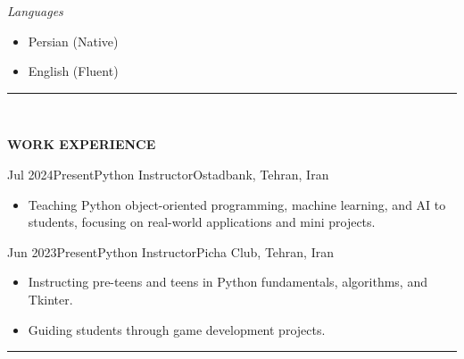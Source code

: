 \documentclass[11pt, b4paper]{cv}
\begin{document}
\vspace{-0.1in}
\textit{Languages}
\vspace{-0.1in}

\begin{multicols}{3}[\columnsep=0cm]
	\begin{itemize}
	\setlength\itemsep{-1pt}
	  \item  Persian (Native)
	  \item  English (Fluent)
	\end{itemize}
\end{multicols}

\pagebreak
\rule{\textwidth}{1pt}\\
\vspace{-0.15in}

\textbf{WORK EXPERIENCE}

\begin{work}{Jul 2024}{Present}{Python Instructor}{Ostadbank, Tehran, Iran}
	\begin{itemize}
		\item Teaching Python object-oriented programming, machine learning, and AI to students, focusing on real-world applications and mini projects.
	\end{itemize}
\end{work}

\vspace{-0.1in}

\begin{work}{Jun 2023}{Present}{Python Instructor}{Picha Club, Tehran, Iran}
	\begin{itemize}
		\item Instructing pre-teens and teens in Python fundamentals, algorithms, and Tkinter.
		\item Guiding students through game development projects.
	\end{itemize}
\end{work}

\vspace{-0.15in}
\rule{\textwidth}{1pt}
\vspace{-0.15in}
\end{document}
